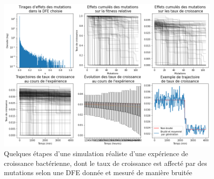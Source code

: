 \documentclass[12pt]{article}
\begin{document}
\begin{figure}[!h]
  \begin{center}
    \vspace{3mm}
    \includegraphics[scale=0.5]{../Img/Simulations.png}
  \end{center} 
  \caption{\label{fig:simulations}Quelques étapes d'une simulation réaliste d'une expérience de croissance bactérienne, dont le taux de croissance est affecté par des mutations selon une DFE donnée et mesuré de manière bruitée}
\end{figure}
\end{document}
